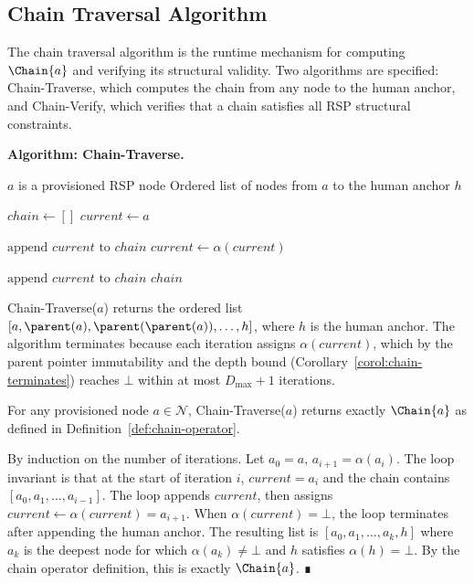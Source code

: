 \subsection{Chain Traversal Algorithm}
\label{sec:chain-traversal-algorithm}

The chain traversal algorithm is the runtime mechanism for computing $\Chain{a}$ and verifying its structural validity. Two algorithms are specified: Chain-Traverse, which computes the chain from any node to the human anchor, and Chain-Verify, which verifies that a chain satisfies all RSP structural constraints.

\bigskip
\noindent\textbf{Algorithm: Chain-Traverse.}

\begin{algorithm}
\caption{Chain-Traverse($a$) --- Compute the delegation chain from node $a$ to human anchor}
\label{alg:chain-traverse}
\begin{algorithmic}[1]
\REQUIRE $a$ is a provisioned RSP node
\ENSURE Ordered list of nodes from $a$ to the human anchor $h$

\STATE $chain \leftarrow []$
\STATE $current \leftarrow a$

    \STATE $\text{append } current \text{ to } chain$
    \STATE $current \leftarrow \alpha(current)$
\ENDWHILE

\STATE $\text{append } current \text{ to } chain$ 
\RETURN $chain$
\end{algorithmic}
\end{algorithm}

Chain-Traverse($a$) returns the ordered list $[a, \parent(a), \parent(\parent(a)), \ldots, h]$, where $h$ is the human anchor. The algorithm terminates because each iteration assigns $\alpha(current)$, which by the parent pointer immutability and the depth bound (Corollary~\ref{corol:chain-terminates}) reaches $\bot$ within at most $D_{\max} + 1$ iterations.

\begin{prop}
\label{prop:chain-traverse-correct}
For any provisioned node $a \in \mathcal{N}$, Chain-Traverse($a$) returns exactly $\Chain{a}$ as defined in Definition~\ref{def:chain-operator}.
\end{prop}
\begin{pf}
By induction on the number of iterations. Let $a_0 = a$, $a_{i+1} = \alpha(a_i)$. The loop invariant is that at the start of iteration $i$, $current = a_i$ and the chain contains $[a_0, a_1, \ldots, a_{i-1}]$. The loop appends $current$, then assigns $current \leftarrow \alpha(current) = a_{i+1}$. When $\alpha(current) = \bot$, the loop terminates after appending the human anchor. The resulting list is $[a_0, a_1, \ldots, a_k, h]$ where $a_k$ is the deepest node for which $\alpha(a_k) \neq \bot$ and $h$ satisfies $\alpha(h) = \bot$. By the chain operator definition, this is exactly $\Chain{a}$. ∎
\end{pf}


